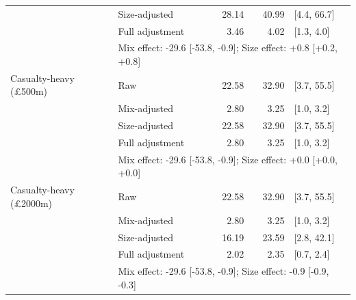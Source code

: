 \begin{table}[htbp]
\begin{tabular}{llrrl}
 & Size-adjusted & 28.14 & 40.99 & [4.4, 66.7] \\
 & Full adjustment & 3.46 & 4.02 & [1.3, 4.0] \\
 & \multicolumn{4}{l}{\footnotesize Mix effect: -29.6 [-53.8, -0.9]; Size effect: +0.8 [+0.2, +0.8]} \\
\addlinespace
Casualty-heavy (\pounds 500m) & Raw & 22.58 & 32.90 & [3.7, 55.5] \\
 & Mix-adjusted & 2.80 & 3.25 & [1.0, 3.2] \\
 & Size-adjusted & 22.58 & 32.90 & [3.7, 55.5] \\
 & Full adjustment & 2.80 & 3.25 & [1.0, 3.2] \\
 & \multicolumn{4}{l}{\footnotesize Mix effect: -29.6 [-53.8, -0.9]; Size effect: +0.0 [+0.0, +0.0]} \\
\addlinespace
Casualty-heavy (\pounds 2000m) & Raw & 22.58 & 32.90 & [3.7, 55.5] \\
 & Mix-adjusted & 2.80 & 3.25 & [1.0, 3.2] \\
 & Size-adjusted & 16.19 & 23.59 & [2.8, 42.1] \\
 & Full adjustment & 2.02 & 2.35 & [0.7, 2.4] \\
 & \multicolumn{4}{l}{\footnotesize Mix effect: -29.6 [-53.8, -0.9]; Size effect: -0.9 [-0.9, -0.3]} \\
\bottomrule
\end{tabular}
\end{table}